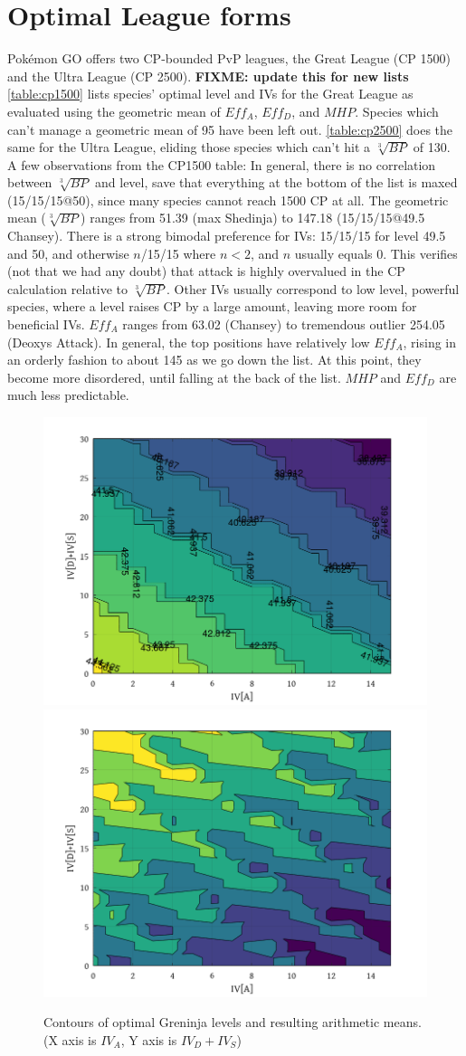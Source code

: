 \section{Optimal League forms}
Pokémon GO offers two CP-bounded PvP leagues, the Great League (CP 1500) and
   the Ultra League (CP 2500).
\textbf{FIXME: update this for new lists}
\autoref{table:cp1500} lists species' optimal level and IVs for the Great League
  as evaluated using the geometric mean of $Eff_A$, $Eff_D$, and $MHP$.
Species which can't manage a geometric mean of 95 have been left out.
\autoref{table:cp2500} does the same for the Ultra League, eliding those species which
  can't hit a $\sqrt[3]{BP}$ of 130.
A few observations from the CP1500 table:
In general, there is no correlation between $\sqrt[3]{BP}$ and level,
  save that everything at the bottom of the list is maxed (15/15/15@50),
  since many species cannot reach 1500 CP at all.
The geometric mean ($\sqrt[3]{BP}$) ranges from 51.39 (max Shedinja)
  to 147.18 (15/15/15@49.5 Chansey).
There is a strong bimodal preference for IVs: 15/15/15 for level 49.5
  and 50, and otherwise $n$/15/15 where $n < 2$, and $n$ usually equals 0.
This verifies (not that we had any doubt) that attack is highly overvalued in the CP calculation relative to $\sqrt[3]{BP}$.
Other IVs usually correspond to low level, powerful species, where a level
  raises CP by a large amount, leaving more room for beneficial IVs.
$Eff_A$ ranges from 63.02 (Chansey) to tremendous outlier 254.05 (Deoxys Attack).
In general, the top positions have relatively low $Eff_A$, rising in an
  orderly fashion to about 145 as we go down the list.
At this point, they become more disordered, until falling at the back
  of the list.
$MHP$ and $Eff_D$ are much less predictable.
\begin{figure}[h]
\centering
\includegraphics[width=.5\textwidth,keepaspectratio]{octave/greninjalevels.png}
\includegraphics[width=.5\textwidth,keepaspectratio]{octave/greninjagmeans.png}
\caption{Contours of optimal Greninja levels and resulting arithmetic means.\\
  (X axis is $IV_A$, Y axis is $IV_D + IV_S$)}
\label{fig:contours}
\end{figure}
